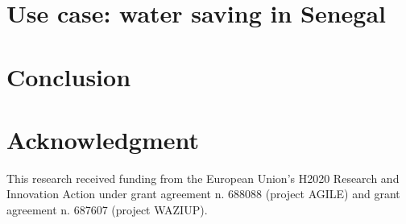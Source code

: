 \documentclass[10pt, conference, compsocconf]{IEEEtran}
\newcommand {\0} {\mathbf 0}
\newcommand {\1} {\mathbf 1}
\begin{document}
\section{Use case: water saving in Senegal}
\label{usecase}

\section{Conclusion}
\label{conclu}


\section*{Acknowledgment}
This research received funding from the European Union's H2020 Research and Innovation Action under grant agreement n. 688088 (project AGILE) and grant agreement n. 687607 (project WAZIUP).



\end{document}
